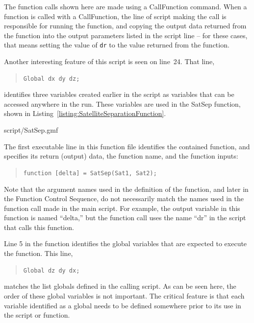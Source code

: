 \noindent The function calls shown here are made using a CallFunction command.  When a function is
called with a CallFunction, the line of script making the call is responsible for running the
function, and copying the output data returned from the function into the output parameters listed
in the script line -- for these cases, that means setting the value of \texttt{dr} to the value
returned from the function.

Another interesting feature of this script is seen on line~24.  That line,

\begin{quote}
\texttt{Global dx dy dz;}
\end{quote}

\noindent identifies three variables created earlier in the script as variables that can be
accessed anywhere in the run.  These variables are used in the SatSep function, shown in
Listing~\ref{listing:SatelliteSeparationFunction}.

\lstset{numbers=left}

{script/SatSep.gmf}
\lstset{numbers=none}

The first executable line in this function file identifies the contained function, and specifies
its return (output) data, the function name, and the function inputs:

\begin{quote}
\texttt{function [delta] = SatSep(Sat1, Sat2);}
\end{quote}

\noindent Note that the argument names used in the definition of the function, and later in the
Function Control Sequence, do not necessarily match the names used in the function call made in the
main script.  For example, the output variable in this function is named ``delta,'' but the function
call uses the name ``dr'' in the script that calls this function.

Line 5 in the function identifies the global variables that are expected to execute the function. 
This line,

\begin{quote}
\texttt{Global dz dy dx;}
\end{quote}

\noindent matches the list globals defined in the calling script.  As can be seen here, the order of
these global variables is not important.  The critical feature is that each variable identified as a
global needs to be defined somewhere prior to its use in the script or function.

